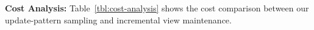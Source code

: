 


\vspace{.5em}
{\noindent \bf Cost Analysis: }
 Table~\ref{tbl:cost-analysis} shows the cost comparison between our update-pattern sampling and incremental view maintenance.
\vspace{-0.5em}
